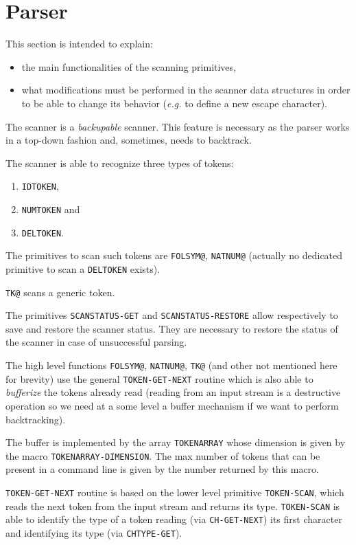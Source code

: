 \section{Parser}

This section is intended to explain:
%
\begin{itemize}
	\item
		the main functionalities of the {\GF} scanning primitives,
	\item
		what modifications must be performed in the scanner data
		structures in order to be able to change its behavior ({\em e.g.} to
		define a new escape character).
\end{itemize}

The {\GF} scanner is a {\em backupable} scanner.
This feature is necessary as the parser works in a top-down fashion and,
sometimes, needs to backtrack. 

The {\GF} scanner is able to recognize three types of tokens:
%
\begin{enumerate}
	\item {\tt IDTOKEN},
	\item {\tt NUMTOKEN} and
	\item {\tt DELTOKEN}.
\end{enumerate}

The primitives to scan such tokens are \verb+FOLSYM@+, \verb+NATNUM@+ (actually
no dedicated primitive to scan a \verb+DELTOKEN+ exists).

\verb+TK@+ scans a generic token.

The primitives \verb+SCANSTATUS-GET+ and \verb+SCANSTATUS-RESTORE+ allow
respectively to save and restore the scanner status.
They are necessary to restore the status of the scanner in case of
unsuccessful parsing.

The high level functions \verb+FOLSYM@+, \verb+NATNUM@+, \verb+TK@+ (and other
not mentioned here for brevity) use the general \verb+TOKEN-GET-NEXT+ routine
which is also able to {\em bufferize} the tokens already read (reading from
an input stream is a destructive operation so we need at a some level a
buffer mechanism if we want to perform backtracking).

The buffer is implemented by the array \verb+TOKENARRAY+ whose dimension is
given by the macro \verb+TOKENARRAY-DIMENSION+. The max number of tokens
that can be present in a command line is given by the number returned
by this macro.

\verb+TOKEN-GET-NEXT+ routine is based on the lower level primitive
\verb+TOKEN-SCAN+, which reads the next token from the input stream and returns
its type.
\verb+TOKEN-SCAN+ is able to identify the type of a token reading (via 
\verb+CH-GET-NEXT+) its first character and identifying its type (via
\verb+CHTYPE-GET+).

